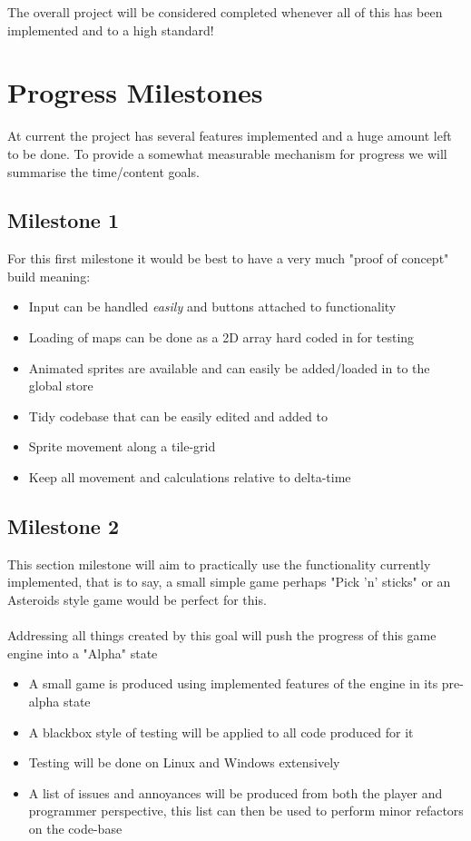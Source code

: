 \documentclass[14pt]{extarticle}
\begin{document}
The overall project will be considered completed whenever all of this has been implemented and to a high standard! 


\section{Progress Milestones} 
\par 
At current the project has several features implemented and a huge amount left to be done. To provide a somewhat measurable mechanism for progress we will summarise the time/content goals. 

   	\subsection{Milestone 1}
      For this first milestone it would be best to have a very much "proof of concept" build meaning:
      \begin{itemize}
      	
      	\item{Input can be handled {\em easily}  and buttons attached to functionality}
      	\item{Loading of maps can be done as a 2D array hard coded in for testing}
      	\item{Animated sprites are available and can easily be added/loaded in to the global store}
      	\item{Tidy codebase that can be easily edited and added to}
      	\item{Sprite movement along a tile-grid}
      	\item{Keep all movement and calculations relative to delta-time}
      \end{itemize}
      
   	\subsection{Milestone 2}
      This section milestone will aim to practically use the functionality currently implemented, that is to say, a small simple game perhaps "Pick 'n' sticks" or an Asteroids style game would be perfect for this. 
      \\
      \\
Addressing all things created by this goal will push the progress of this game engine into a "Alpha" state 
      \begin{itemize}
      	
      	\item{A small game is produced using implemented features of the engine in its pre-alpha state}
      	\item{A blackbox style of testing will be applied to all code produced for it}
      	\item{Testing will be done on Linux and Windows extensively}
      	\item{A list of issues and annoyances will be produced from both the player and programmer perspective,
      			this list can then be used to perform minor refactors on the code-base }
      \end{itemize}
      
\end{document}
